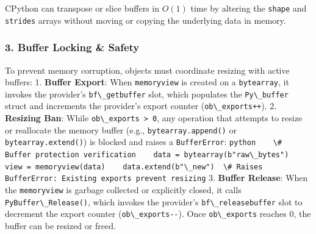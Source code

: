 CPython can transpose or slice buffers in \(O(1)\) time by altering the
\passthrough{\lstinline!shape!} and \passthrough{\lstinline!strides!}
arrays without moving or copying the underlying data in memory.

\hypertarget{buffer-locking-safety}{%
\subsubsection{3. Buffer Locking \&
Safety}\label{buffer-locking-safety}}

To prevent memory corruption, objects must coordinate resizing with
active buffers: 1. \textbf{Buffer Export}: When
\passthrough{\lstinline!memoryview!} is created on a
\passthrough{\lstinline!bytearray!}, it invokes the provider's
\passthrough{\lstinline!bf\_getbuffer!} slot, which populates the
\passthrough{\lstinline!Py\_buffer!} struct and increments the
provider's export counter (\passthrough{\lstinline!ob\_exports++!}). 2.
\textbf{Resizing Ban}: While \passthrough{\lstinline!ob\_exports > 0!},
any operation that attempts to resize or reallocate the memory buffer
(e.g., \passthrough{\lstinline!bytearray.append()!} or
\passthrough{\lstinline!bytearray.extend()!}) is blocked and raises a
\passthrough{\lstinline!BufferError!}:
\passthrough{\lstinline!python    \# Buffer protection verification    data = bytearray(b"raw\_bytes")    view = memoryview(data)    data.extend(b"\_new")  \# Raises BufferError: Existing exports prevent resizing!}
3. \textbf{Buffer Release}: When the
\passthrough{\lstinline!memoryview!} is garbage collected or explicitly
closed, it calls \passthrough{\lstinline!PyBuffer\_Release()!}, which
invokes the provider's \passthrough{\lstinline!bf\_releasebuffer!} slot
to decrement the export counter
(\passthrough{\lstinline!ob\_exports--!}). Once
\passthrough{\lstinline!ob\_exports!} reaches 0, the buffer can be
resized or freed.
